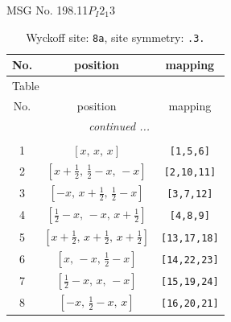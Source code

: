 \documentclass[fleqn,8pt]{jsarticle}
\begin{document}
\setcounter{MaxMatrixCols}{32}

\renewcommand{\tablename}{Table~}
\renewcommand{\figurename}{Figure~}
\begin{center}
\LARGE
MSG No. 198.11\quad$P_{I}2_{1}3$
\end{center}
\renewcommand{\arraystretch}{1.2}
\begin{longtable}{ccc}
\caption{Wyckoff site: {\tt 8a}, site symmetry: {\tt .3.}}
 \\
 \hline \hline
No. & position & mapping \\ \hline \endfirsthead

\multicolumn{2}{l}{\tablename\ \thetable{}} \\
 \hline \hline
No. & position & mapping \\ \hline \endhead

 \hline \hline
\multicolumn{2}{r}{\footnotesize\it continued ...} \\ \endfoot

 \hline \hline
\multicolumn{2}{r}{} \\ \endlastfoot

1 & $\left[ x,\, x,\, x \right]$ & {\tt [1,5,6]} \\ \hline
2 & $\left[ x + \frac{1}{2},\, \frac{1}{2} - x,\, - x \right]$ & {\tt [2,10,11]} \\ \hline
3 & $\left[ - x,\, x + \frac{1}{2},\, \frac{1}{2} - x \right]$ & {\tt [3,7,12]} \\ \hline
4 & $\left[ \frac{1}{2} - x,\, - x,\, x + \frac{1}{2} \right]$ & {\tt [4,8,9]} \\ \hline
5 & $\left[ x + \frac{1}{2},\, x + \frac{1}{2},\, x + \frac{1}{2} \right]$ & {\tt [13,17,18]} \\ \hline
6 & $\left[ x,\, - x,\, \frac{1}{2} - x \right]$ & {\tt [14,22,23]} \\ \hline
7 & $\left[ \frac{1}{2} - x,\, x,\, - x \right]$ & {\tt [15,19,24]} \\ \hline
8 & $\left[ - x,\, \frac{1}{2} - x,\, x \right]$ & {\tt [16,20,21]} \\
\end{longtable}
\renewcommand{\arraystretch}{1.2}
\end{document}
